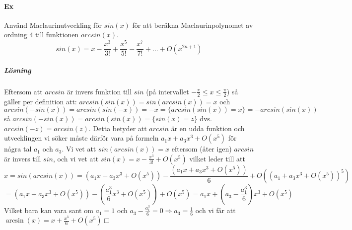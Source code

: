 \paragraph{Ex} Använd Maclaurinutveckling för $sin(x)$ för att beräkna Maclaurinpolynomet av ordning 4 till funktionen $arcsin(x)$.
\begin{equation*}
    sin(x)=x-\frac{x^3}{3!}+\frac{x^5}{5!}-\frac{x^7}{7!}+...+O(x^{2n+1})
\end{equation*}
\subparagraph{Lösning}
Eftersom att $arcsin$ är invers funktion till $sin$ (på intervallet $-\frac{\pi}{2}\leq x \leq \frac{\pi}{2}$) så gäller per definition att:
$arcsin(sin(x))=sin(arcsin(x))=x$ och $arcsin(-sin(x))=arcsin(sin(-x))=-x=\{arcsin(sin(x))=x\}=-arcsin(sin(x))$ så $arcsin(-sin(x))=arcsin(sin(x))=\{sin(x)=z\}$
dvs. $arcsin(-z)=arcsin(z)$.
Detta betyder att $arcsin$ är en udda funktion och utvecklingen vi söker måste därför vara på formeln $a_1x+a_3x^3+O(x^5)$ för några tal $a_1$ och $a_3$.
Vi vet att $sin(arcsin(x))=x$ eftersom (åter igen) $arcsin$ är invers till $sin$,
och vi vet att $sin(x)=x-\frac{x^3}{3!}+O(x^5)$ vilket leder till att
\begin{equation*}
    x=sin(arcsin(x))=(a_1x+a_3x^3+O(x^5))-\frac{(a_1x+a_3x^3+O(x^5))}{6}+O((a_1+a_3x^3+O(x^5))^5)
\end{equation*}
\begin{equation*}
    =(a_1x+a_3x^3+O(x^5))-(\frac{a_1^3}{6}x^3+O(x^5))+O(x^5)=a_1x+(a_3-\frac{a_1^3}{6})x^3+O(x^5)
\end{equation*}
Vilket bara kan vara sant om $a_1=1$ och $a_3-\frac{a_1^3}{6}=0\Rightarrow a_3=\frac{1}{6}$ och vi får att $\arcsin(x)=x+\frac{x^3}{6}+O(x^5)\Box$